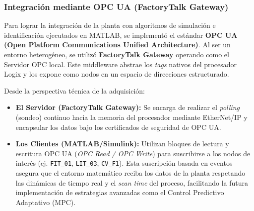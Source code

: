 \subsubsection{Integración mediante OPC UA (FactoryTalk Gateway)}
Para lograr la integración de la planta con algoritmos de simulación e identificación ejecutados en MATLAB, se implementó el estándar \textbf{OPC UA (Open Platform Communications Unified Architecture)}. Al ser un entorno heterogéneo, se utilizó \textbf{FactoryTalk Gateway} operando como el Servidor OPC local. Este middleware abstrae los \textit{tags} nativos del procesador Logix y los expone como nodos en un espacio de direcciones estructurado.

Desde la perspectiva técnica de la adquisición:
\begin{itemize}
    \item \textbf{El Servidor (FactoryTalk Gateway):} Se encarga de realizar el \textit{polling} (sondeo) continuo hacia la memoria del procesador mediante EtherNet/IP y encapsular los datos bajo los certificados de seguridad de OPC UA.
    \item \textbf{Los Clientes (MATLAB/Simulink):} Utilizan bloques de lectura y escritura OPC UA (\textit{OPC Read / OPC Write}) para suscribirse a los nodos de interés (ej. \texttt{FIT\_01}, \texttt{LIT\_03}, \texttt{CV\_F1}). Esta suscripción basada en eventos asegura que el entorno matemático reciba los datos de la planta respetando las dinámicas de tiempo real y el \textit{scan time} del proceso, facilitando la futura implementación de estrategias avanzadas como el Control Predictivo Adaptativo (MPC).
\end{itemize}
